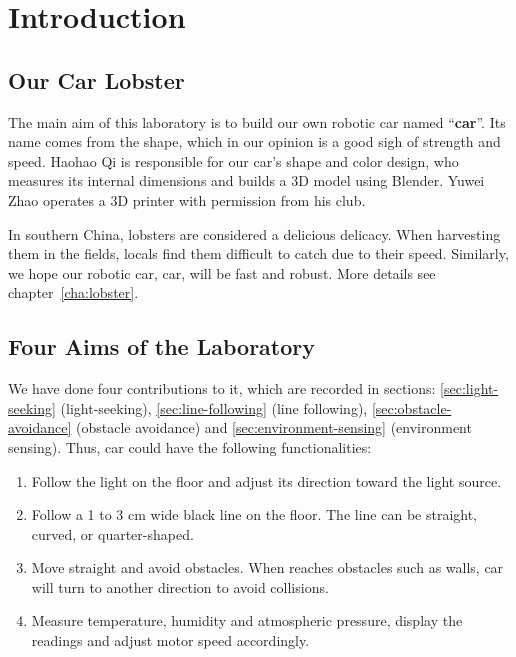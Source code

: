 \documentclass[../main]{subfiles}
\begin{document}
\chapter{Introduction}
\label{ch:introduction}

\section{Our Car Lobster}

The main aim of this laboratory is to build our own robotic car named ``\textbf{\gls{car}}''.
Its name comes from the shape, which in our opinion is a good sigh of strength and speed.
Haohao Qi is responsible for our car's shape and color design,
who measures its internal dimensions and builds a 3D model using Blender.
Yuwei Zhao operates a 3D printer with permission from his club.

In southern China, lobsters are considered a delicious delicacy.
When harvesting them in the fields, locals find them difficult to catch due to their speed.
Similarly, we hope our robotic car, \gls{car}, will be fast and robust.
More details see chapter~\ref{cha:lobster}.

\section{Four Aims of the Laboratory}

We have done four contributions to it, which are recorded in
sections: \ref{sec:light-seeking} (light-seeking), \ref{sec:line-following} (line following), \ref{sec:obstacle-avoidance} (obstacle avoidance) and \ref{sec:environment-sensing} (environment sensing).
Thus, \gls{car} could have the following functionalities:

\begin{enumerate}
\item Follow the light on the floor and adjust its direction toward the light source.
\item Follow a 1 to 3 cm wide black line on the floor.
The line can be straight, curved, or quarter-shaped.
\item Move straight and avoid obstacles.
When reaches obstacles such as walls, \gls{car} will turn to another direction to avoid collisions.
\item Measure temperature, humidity and atmospheric pressure,
display the readings and adjust motor speed accordingly.
\end{enumerate}
\end{document}
